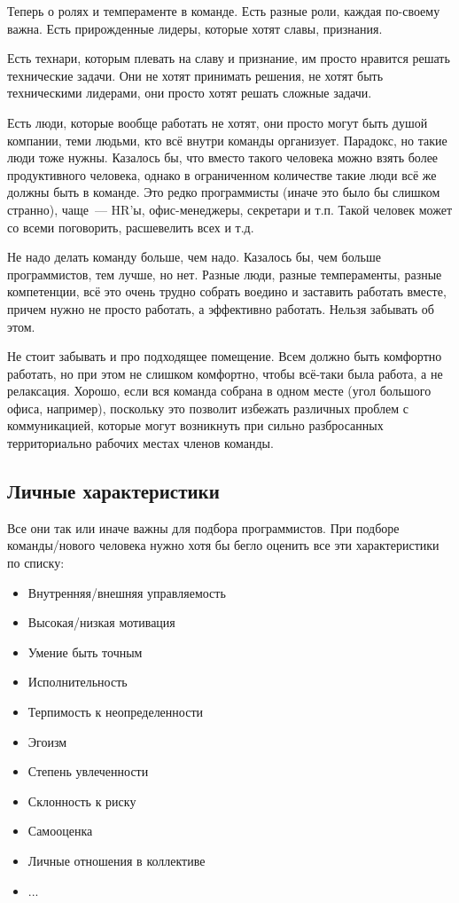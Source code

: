 \documentclass{../../text-style}
\begin{document}
Теперь о ролях и темпераменте в команде. Есть разные роли, каждая по-своему важна. Есть прирожденные лидеры, которые хотят славы, признания.

Есть технари, которым плевать на славу и признание, им просто нравится решать технические задачи. Они не хотят принимать решения, не хотят быть техническими лидерами, они просто хотят решать сложные задачи.

Есть люди, которые вообще работать не хотят, они просто могут быть душой компании, теми людьми, кто всё внутри команды организует. Парадокс, но такие люди тоже нужны. Казалось бы, что вместо такого человека можно взять более продуктивного человека, однако в ограниченном количестве такие люди всё же должны быть в команде. Это редко программисты (иначе это было бы слишком странно), чаще~--- HR’ы, офис-менеджеры, секретари и т.п. Такой человек может со всеми поговорить, расшевелить всех и т.д.

Не надо делать команду больше, чем надо. Казалось бы, чем больше программистов, тем лучше, но нет. Разные люди, разные темпераменты, разные компетенции, всё это очень трудно собрать воедино и заставить работать вместе, причем нужно не просто работать, а эффективно работать. Нельзя забывать об этом.

Не стоит забывать и про подходящее помещение. Всем должно быть комфортно работать, но при этом не слишком комфортно, чтобы всё-таки была работа, а не релаксация. Хорошо, если вся команда собрана в одном месте (угол большого офиса, например), поскольку это позволит избежать различных проблем с коммуникацией, которые могут возникнуть при сильно разбросанных территориально рабочих местах членов команды.

\subsection{Личные характеристики}

Все они так или иначе важны для подбора программистов. При подборе команды/нового человека нужно хотя бы бегло оценить все эти характеристики по списку:

\begin{itemize}
    \item Внутренняя/внешняя управляемость
    \item Высокая/низкая мотивация
    \item Умение быть точным
    \item Исполнительность
    \item Терпимость к неопределенности
    \item Эгоизм
    \item Степень увлеченности
    \item Склонность к риску
    \item Самооценка
    \item Личные отношения в коллективе
    \item ...
\end{itemize}
\end{document}
